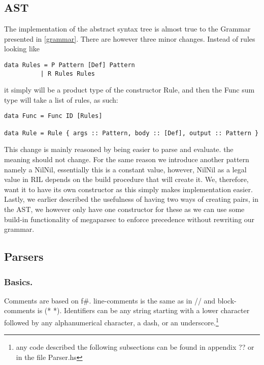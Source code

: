 \documentclass[a4paper]{article}
\begin{document}
\subsection{AST}
\label{sec:orgfff26ab}
The implementation of the abstract syntax tree is almost true to the Grammar presented in \ref{grammar}. There are however three minor changes. Instead of rules looking like
\begin{verbatim}
data Rules = P Pattern [Def] Pattern
          | R Rules Rules
\end{verbatim}
it simply will be a product type of the constructor Rule, and then the Func sum type will take a list of rules, as such:
\begin{verbatim}
data Func = Func ID [Rules]

data Rule = Rule { args :: Pattern, body :: [Def], output :: Pattern }
\end{verbatim}
This change is mainly reasoned by being easier to parse and evaluate. the meaning should not change.
For the same reason we introduce another pattern namely a NilNil, essentially this is a constant value, however, NilNil as a legal value in RIL depends on the build procedure that will create it. We, therefore, want it to have its own constructor as this simply makes implementation easier.
Lastly, we earlier described the usefulness of having two ways of creating pairs, in the AST, we however only have one constructor for these as we can use some build-in functionality of megaparsec to enforce precedence without rewriting our grammar.
\subsection{Parsers}
\label{sec:org2ce1cd5}
\subsubsection{Basics.}
\label{sec:org762656c}
Comments are based on f\#. line-comments is the same as in // and block-comments is (* *). Identifiers can be any string starting with a lower character followed by any alphanumerical character, a dash, or an underscore.\footnote{any code described the following subsections can be found in appendix ?? or in the file Parser.hs}
\end{document}
